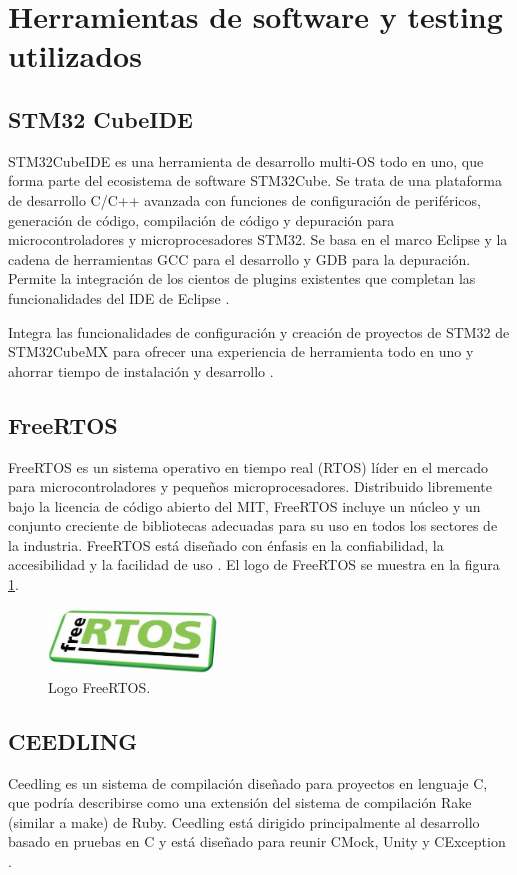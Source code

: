 \section{Herramientas de software y testing utilizados}
\subsection{STM32 CubeIDE}
STM32CubeIDE es una herramienta de desarrollo multi-OS todo en uno, que forma parte del ecosistema de software STM32Cube. Se trata de una plataforma de desarrollo C/C++ avanzada con funciones de configuración de periféricos, generación de código, compilación de código y depuración para microcontroladores y microprocesadores STM32. Se basa en el marco Eclipse  y la cadena de herramientas GCC para el desarrollo y GDB para la depuración. Permite la integración de los cientos de plugins existentes que completan las funcionalidades del IDE de Eclipse \citep{STM32CUBEIDE}.

Integra las funcionalidades de configuración y creación de proyectos de STM32 de STM32CubeMX para ofrecer una experiencia de herramienta todo en uno y ahorrar tiempo de instalación y desarrollo \citep{STM32CUBEIDE}.

\subsection{FreeRTOS}
\label{subsec:FreeRTOS}
FreeRTOS es un sistema operativo en tiempo real (RTOS) líder en el mercado para microcontroladores y pequeños microprocesadores. Distribuido libremente bajo la licencia de código abierto del MIT, FreeRTOS incluye un núcleo y un conjunto creciente de bibliotecas adecuadas para su uso en todos los sectores de la industria.
FreeRTOS está diseñado con énfasis en la confiabilidad, la accesibilidad y la facilidad de uso \citep{FreeRTOS}. El logo de FreeRTOS se muestra en la figura \ref{fig:FreeRTOS}.
\begin{figure}[htbp]
	\centering
	\includegraphics[width=0.4\textwidth]{./Figures/logo_FreeRTOS.jpg}
	\caption{Logo FreeRTOS.}
	\label{fig:FreeRTOS}
\end{figure}
\subsection{CEEDLING}
Ceedling es un sistema de compilación diseñado para proyectos en lenguaje C, que podría describirse como una extensión del sistema de compilación Rake (similar a make) de Ruby. Ceedling está dirigido principalmente al desarrollo basado en pruebas en C y está diseñado para reunir CMock, Unity y CException \citep{CEEDLING}.

